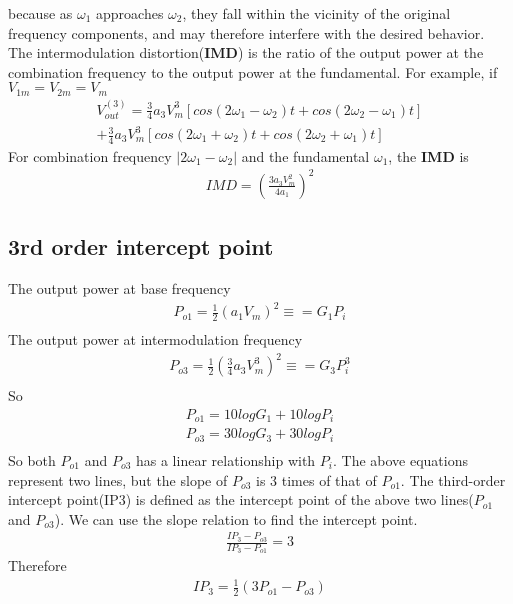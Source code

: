 \documentclass[a4paper]{article}
\begin{document}
because as $\omega_1$ approaches $\omega_2$, they fall within the vicinity of the original frequency components, and may therefore interfere with the desired behavior. The intermodulation distortion({\bf IMD}) is the ratio of the output power at the combination frequency to the output power at the fundamental. For example, if $V_{1m} = V_{2m} = V_m$
\begin{align*}
	V^{(3)}_{out} = \frac{3}{4}a_3 V^3_{m}[cos(2\omega_1 - \omega_2)t +  cos(2\omega_2 - \omega_1)t] \\
					+ \frac{3}{4}a_3 V^3_{m}[cos(2\omega_1 + \omega_2)t +  cos(2\omega_2 + \omega_1)t]
\end{align*}
For combination frequency $|2\omega_1 - \omega_2|$ and the fundamental $\omega_1$, the {\bf IMD} is
\begin{align*}
	IMD = (\frac{3a_3 V_m^2}{4 a_1})^2
\end{align*}
\subsection{3rd order intercept point}
The output power at base frequency 
\begin{align*}
	P_{o1} = \frac{1}{2} (a_1 V_m)^2 \equiv = G_1 P_i \\ 
\end{align*}
The output power at intermodulation frequency 
\begin{align*}
	P_{o3} = \frac{1}{2} (\frac{3}{4}a_3 V^3_m)^2 \equiv = G_3 P^3_i \\
\end{align*}
So
\begin{align*}
	P_{o1} = 10 log G_1 + 10 log P_i\\
    P_{o3} = 30 log G_3	+ 30 log P_i\\
 \end{align*}
 So both $P_{o1}$ and $P_{o3}$ has a linear relationship with $P_i$. The above equations represent two lines, but the slope of $P_{o3}$ is 3 times of that of $P_{o1}$.
 The third-order intercept point(IP3) is defined as the intercept point of the above two lines($P_{o1}$ and $P_{o3}$). We can use the slope relation to find the intercept point.
 \begin{align*}
	\frac{IP_3 - P_{o3}}{IP_3 - P_{o1}} = 3
\end{align*}
Therefore
\begin{align*}
	IP_3 = \frac{1}{2} (3P_{o1} - P_{o3})
\end{align*}
\end{document}
